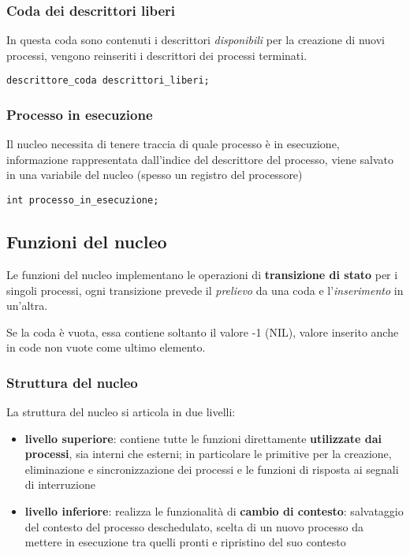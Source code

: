 \subsubsection{Coda dei descrittori liberi}
In questa coda sono contenuti i descrittori \textit{disponibili} per la creazione di nuovi processi, vengono reinseriti i descrittori dei processi terminati.

\begin{verbatim}
descrittore_coda descrittori_liberi;
\end{verbatim}

\subsubsection{Processo in esecuzione}
Il nucleo necessita di tenere traccia di quale processo è in esecuzione, informazione rappresentata dall'indice del descrittore del processo, viene salvato in una variabile del nucleo (spesso un registro del processore)
\begin{verbatim}
int processo_in_esecuzione;
\end{verbatim}

\subsection{Funzioni del nucleo}
Le funzioni del nucleo implementano le operazioni di \textbf{transizione di stato} per i singoli processi, ogni transizione prevede il \textit{prelievo} da una coda e l'\textit{inserimento} in un'altra.

Se la coda è vuota, essa contiene soltanto il valore -1 (NIL), valore inserito anche in code non vuote come ultimo elemento.

\subsubsection{Struttura del nucleo}
La struttura del nucleo si articola in due livelli:
\begin{itemize}
    \item \textbf{livello superiore}: contiene tutte le funzioni direttamente \textbf{utilizzate dai processi}, sia interni che esterni; in particolare le primitive per la creazione, eliminazione e sincronizzazione dei processi e le funzioni di risposta ai segnali di interruzione
    \item \textbf{livello inferiore}: realizza le funzionalità di \textbf{cambio di contesto}: salvataggio del contesto del processo deschedulato, scelta di un nuovo processo da mettere in esecuzione tra quelli pronti e ripristino del suo contesto
\end{itemize}

